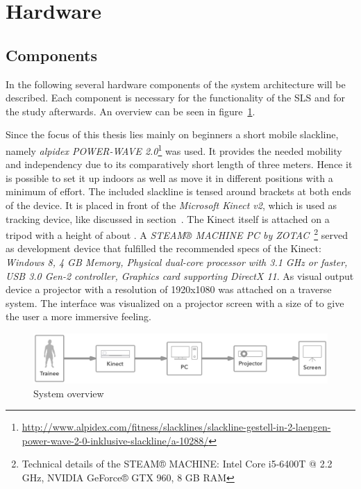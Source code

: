 \section{Hardware}\label{5_1_systemSetup}
\subsection{Components}\label{5_1_hardwareComponents}
In the following several hardware components of the system architecture will be described. Each component is necessary for the functionality of the SLS and for the study afterwards. An overview can be seen in figure~\ref{fig:5_3_systemArchitecture}.

Since the focus of this thesis lies mainly on beginners a short mobile slackline, namely \textit{alpidex POWER-WAVE 2.0}\footnote{\url{http://www.alpidex.com/fitness/slacklines/slackline-gestell-in-2-laengen-power-wave-2-0-inklusive-slackline/a-10288/}} was used.
It provides the needed mobility and independency due to its comparatively short length of three meters.
Hence it is possible to set it up indoors as well as move it in different positions with a minimum of effort.
The included slackline is tensed around brackets at both ends of the device.
It is placed in front of the \textit{Microsoft Kinect v2}, which is used as tracking device, like discussed in section~\textit{}. The Kinect itself is attached on a  tripod with a height of about .
A \textit{STEAM® MACHINE PC by ZOTAC}~\footnote{Technical details of the STEAM® MACHINE: Intel Core i5-6400T @ 2.2 GHz, NVIDIA GeForce® GTX 960, 8 GB RAM} served as development device that fulfilled the recommended specs of the Kinect: \textit{Windows 8, 4 GB Memory, Physical dual-core processor with 3.1 GHz or faster, USB 3.0 Gen-2 controller, Graphics card supporting DirectX 11}. As visual output device a projector  with a resolution of 1920x1080 was attached on a traverse system.
The interface was visualized on a projector screen with a size of  to give the user a more immersive feeling.

\begin{figure}[htb]
	\centering
	\begin{minipage}[t]{1\linewidth}
		\centering
		\includegraphics[width=1\linewidth]{Pictures/5_3_systemArchitecture}
		\caption{System overview}
		\label{fig:5_3_systemArchitecture}
	\end{minipage}
\end{figure}

